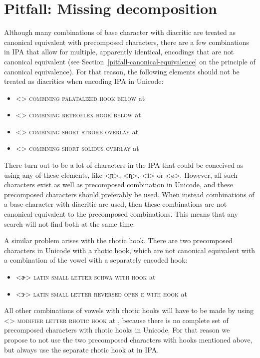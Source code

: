 \section{Pitfall: Missing decomposition}
\label{pitfall-missing-decomposition}

Although many combinations of base character with diacritic are treated as
canonical equivalent with precomposed characters, there are a few combinations
in IPA that allow for multiple, apparently identical, encodings that are not
canonical equivalent (see Section~\ref{pitfall-canonical-equivalence} on the
principle of canonical equivalence). For that reason, the following elements
should not be treated as diacritics when encoding IPA in Unicode:
\begin{itemize}
  \item[] <{}> \textsc{combining palatalized hook below} at 
  \item[] <{}> \textsc{combining retroflex hook below} at 
  \item[] <> \textsc{combining short stroke overlay} at 
  \item[] <> \textsc{combining short solidus overlay} at 
\end{itemize} 

There turn out to be a lot of characters in the IPA that could be conceived as
using any of these elements, like <ɲ>, <ɳ>, <ɨ> or <ø>. However, all such
characters exist as well as precomposed combination in Unicode, and these
precomposed characters should preferably be used. When instead combinations of a base character with
diacritic are used, then these combinations are not canonical equivalent to the
precomposed combinations. This means that any search will not find both at the
same time.


A similar problem arises with the rhotic hook. There are two precomposed
characters in Unicode with a rhotic hook, which are not canonical equivalent 
with a combination of the vowel with a separately encoded hook:
\begin{itemize}
  \item[] <ɚ> \textsc{latin small letter schwa with hook} at 
  \item[] <ɝ> \textsc{latin small letter reversed open e with hook} at 
\end{itemize}
All other combinations of vowels with rhotic hooks will have to be made by using
<> \textsc{modifier letter rhotic hook} at , because there
is no complete set of precomposed characters with rhotic hooks in Unicode. For
that reason we propose to not use the two precomposed characters with hooks
mentioned above, but always use the separate rhotic hook at  in IPA.\@

